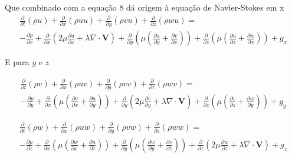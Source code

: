 \documentclass[]{article}
\begin{document}
Que combinado com a equação 8 dá origem à equação de Navier-Stokes em x
\begin{equation}
	\begin{aligned}
	\frac{\partial}{\partial t} (\rho u) + \frac{\partial}{\partial x} (\rho u u) + \frac{\partial}{\partial y} (\rho v u) + \frac{\partial}{\partial z} (\rho w u) = \\
	- \frac{\partial p}{\partial x} + \frac{\partial}{\partial x} \left( 2 \mu \frac{\partial u}{\partial x} + \lambda \nabla \cdot \mathbf{V} \right) +
	\frac{\partial}{\partial y} \left( \mu \left( \frac{\partial u}{\partial y} + \frac{\partial v}{\partial x} \right) \right) +
	\frac{\partial}{\partial z} \left( \mu \left( \frac{\partial u}{\partial z} + \frac{\partial w}{\partial x} \right) \right) + g_x
	\end{aligned}
\end{equation}

E para $y$ e $z$

\begin{equation}
	\begin{aligned}
	\frac{\partial}{\partial t} (\rho v) + \frac{\partial}{\partial x} (\rho u v) + \frac{\partial}{\partial y} (\rho v v) + \frac{\partial}{\partial z} (\rho w v) = \\
	- \frac{\partial p}{\partial y} + \frac{\partial}{\partial x} \left( \mu \left( \frac{\partial v}{\partial x} + \frac{\partial u}{\partial y} \right) \right) +
	\frac{\partial}{\partial y} \left( 2 \mu \frac{\partial v}{\partial y} + \lambda \nabla \cdot \mathbf{V} \right) +
	\frac{\partial}{\partial z} \left( \mu \left( \frac{\partial v}{\partial z} + \frac{\partial w}{\partial y} \right) \right) +  g_y
	\end{aligned}
\end{equation}

\begin{equation}
	\begin{aligned}
	\frac{\partial}{\partial t} (\rho w) + \frac{\partial}{\partial x} (\rho u w) + \frac{\partial}{\partial y} (\rho v w) + \frac{\partial}{\partial z} (\rho w w) = \\
	- \frac{\partial p}{\partial z} + \frac{\partial}{\partial x} \left( \mu \left( \frac{\partial w}{\partial x} + \frac{\partial u}{\partial z} \right) \right) +
	\frac{\partial}{\partial y} \left( \mu \left( \frac{\partial w}{\partial y} + \frac{\partial v}{\partial z} \right) \right) +
	\frac{\partial}{\partial z} \left( 2 \mu \frac{\partial w}{\partial z} + \lambda \nabla \cdot \mathbf{V} \right) +  g_z
	\end{aligned}
\end{equation}
\end{document}
